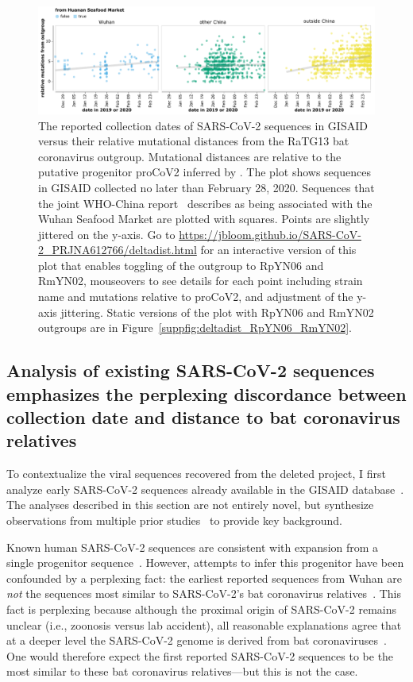 \documentclass[9pt,twocolumn,twoside]{gsajnl_modified}
\begin{document}
\begin{figure}
\centering
\includegraphics[width=\linewidth]{figures/deltadist_RaTG13.pdf}
\caption{The reported collection dates of SARS-CoV-2 sequences in GISAID versus their relative mutational distances from the RaTG13 bat coronavirus outgroup.
Mutational distances are relative to the putative progenitor proCoV2 inferred by \citet{kumar2021evolutionary}.
The plot shows sequences in GISAID collected no later than February 28, 2020.
Sequences that the joint WHO-China report~\citep{WHO2021origins} describes as being associated with the Wuhan Seafood Market are plotted with squares.
Points are slightly jittered on the y-axis.
Go to \url{https://jbloom.github.io/SARS-CoV-2_PRJNA612766/deltadist.html} for an interactive version of this plot that enables toggling of the outgroup to RpYN06 and RmYN02, mouseovers to see details for each point including strain name and mutations relative to proCoV2, and adjustment of the y-axis jittering.
Static versions of the plot with RpYN06 and RmYN02 outgroups are in Figure~\ref{suppfig:deltadist_RpYN06_RmYN02}.
}
\label{fig:deltadist_RaTG13}
\end{figure}

\subsection{Analysis of existing SARS-CoV-2 sequences emphasizes the perplexing discordance between collection date and distance to bat coronavirus relatives}
To contextualize the viral sequences recovered from the deleted project, I first analyze early SARS-CoV-2 sequences already available in the GISAID database~\citep{shu2017gisaid}.
The analyses described in this section are not entirely novel, but synthesize observations from multiple prior studies~\citep{kumar2021evolutionary,pekar2021timing,rambaut2020dynamic,forster2020phylogenetic,pipes2021assessing} to provide key background.

Known human SARS-CoV-2 sequences are consistent with expansion from a single progenitor sequence~\citep{kumar2021evolutionary,pekar2021timing,rambaut2020dynamic,forster2020phylogenetic,pipes2021assessing}.
However, attempts to infer this progenitor have been confounded by a perplexing fact: the earliest reported sequences from Wuhan are \emph{not} the sequences most similar to SARS-CoV-2's bat coronavirus relatives~\citep{pipes2021assessing}.
This fact is perplexing because although the proximal origin of SARS-CoV-2 remains unclear (i.e., zoonosis versus lab accident), all reasonable explanations agree that at a deeper level the SARS-CoV-2 genome is derived from bat coronaviruses~\citep{lytras2021exploring}.
One would therefore expect the first reported SARS-CoV-2 sequences to be the most similar to these bat coronavirus relatives---but this is not the case.
\end{document}
